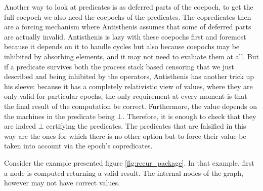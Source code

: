 Another way to look at predicates is as deferred parts of the coepoch,
to get the full coepoch we also need the coepochs of the
predicates. The copredicates then are a forcing mechanism where
Antisthenis assumes that some of deferred parts are actually
invalid. Antisthenis is lazy with these coepochs first and foremost
because it depends on it to handle cycles but also because coepochs
may be inhibited by absorbing elements, and it may not need to
evaluate them at all. But if a predicate survives both the process
stack based censoring that we just described and being inhibited by
the operators, Antisthenis has another trick up his sleeve: because it
has a completely relativistic view of values, where they are only
valid for particular epochs, the only requirement at every moment is
that the final result of the computation be correct. Furthermore, the
value depends on the machines in the predicate being
\(\bot\). Therefore, it is enough to check that they are indeed
\(\bot\) certifying the predicates. The predicates that are falsified
in this way are the ones for which there is no other option but to
force their value be taken into account via the epoch's copredicates.

Consider the example presented figure \ref{fig:recur_package}. In that
example, first a node is computed returning a valid result. The
internal nodes of the graph, however may not have correct
values.


